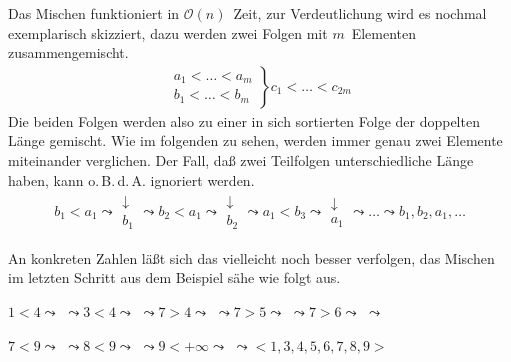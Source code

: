 \documentclass[ngerman,draft,parskip=half*,twoside]{scrreprt}
\theoremstyle{break}
\theoremstyle{nonumberbreak}
\newcommand*{\OO}{\mathcal{O}}      %
\begin{document}
Das Mischen funktioniert in $\OO(n)$~Zeit, zur Verdeutlichung wird es
nochmal exemplarisch skizziert, dazu werden zwei Folgen mit
$m$~Elementen zusammengemischt.
\begin{gather*}
  \left.
    \begin{array}{l}
      a_1<\ldots<a_m\\
      b_1<\ldots<b_m
    \end{array}
  \right\} c_1<\ldots<c_{2m}
\end{gather*}
Die beiden Folgen werden also zu einer in sich sortierten Folge der doppelten Länge gemischt. Wie im folgenden zu sehen, werden immer genau
zwei Elemente miteinander verglichen. Der Fall, daß zwei Teilfolgen unterschiedliche Länge haben, kann o.\,B.\,d.\,A. ignoriert werden.
\begin{align*}
  b_1<a_1 \leadsto
  \begin{array}{l}
    \downarrow\\
    b_1
  \end{array}
  \leadsto b_2<a_1 \leadsto
  \begin{array}{l}
    \downarrow\\
    b_2
  \end{array}
  \leadsto a_1<b_3 \leadsto
  \begin{array}{l}
    \downarrow\\
    a_1
  \end{array}
  \leadsto \ldots \leadsto b_1, b_2, a_1, \ldots
\end{align*}

An konkreten Zahlen läßt sich das vielleicht noch besser verfolgen, das Mischen im letzten Schritt aus dem Beispiel sähe wie folgt aus.


$1<4 \leadsto$  $\leadsto
3<4 \leadsto$  $\leadsto
7>4 \leadsto$  $\leadsto 
7>5 \leadsto$  $\leadsto
7>6 \leadsto$  $\leadsto$
\medskip

$7<9 \leadsto$  $\leadsto
8<9 \leadsto$  $\leadsto
9<+\infty \leadsto$  $
\leadsto<1,3,4,5,6,7,8,9>$
\medskip
\end{document}
